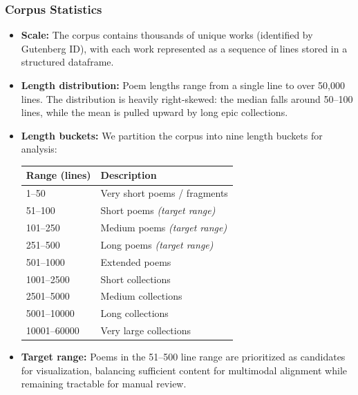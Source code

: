 \documentclass[11pt,a4paper]{article}
\begin{document}
\subsubsection*{Corpus Statistics}
\begin{itemize}
  \item \textbf{Scale:} The corpus contains thousands of unique works (identified by Gutenberg ID), with each work represented as a sequence of lines stored in a structured dataframe.
  \item \textbf{Length distribution:} Poem lengths range from a single line to over 50{,}000 lines. The distribution is heavily right-skewed: the median falls around 50--100 lines, while the mean is pulled upward by long epic collections.
  \item \textbf{Length buckets:} We partition the corpus into nine length buckets for analysis:
  \begin{center}
  \begin{tabular}{ll}
    \hline
    \textbf{Range (lines)} & \textbf{Description} \\
    \hline
    1--50    & Very short poems / fragments \\
    51--100  & Short poems \textit{(target range)} \\
    101--250 & Medium poems \textit{(target range)} \\
    251--500 & Long poems \textit{(target range)} \\
    501--1000 & Extended poems \\
    1001--2500 & Short collections \\
    2501--5000 & Medium collections \\
    5001--10000 & Long collections \\
    10001--60000 & Very large collections \\
    \hline
  \end{tabular}
  \end{center}
  \item \textbf{Target range:} Poems in the 51--500 line range are prioritized as candidates for visualization, balancing sufficient content for multimodal alignment while remaining tractable for manual review.
\end{itemize}
\end{document}
